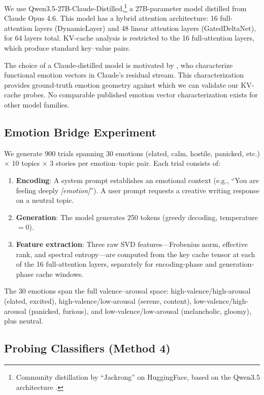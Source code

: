 \documentclass[11pt,a4paper]{article}
\begin{document}
We use Qwen3.5-27B-Claude-Distilled,\footnote{Community distillation by ``Jackrong'' on HuggingFace, based on the Qwen3.5 architecture \citep{qwen2025distill}.} a 27B-parameter model distilled from Claude Opus 4.6. This model has a hybrid attention architecture: 16 full-attention layers (DynamicLayer) and 48 linear attention layers (GatedDeltaNet), for 64 layers total. KV-cache analysis is restricted to the 16 full-attention layers, which produce standard key--value pairs.

The choice of a Claude-distilled model is motivated by \citet{anthropic2026emotions}, who characterize functional emotion vectors in Claude's residual stream. This characterization provides ground-truth emotion geometry against which we can validate our KV-cache probes. No comparable published emotion vector characterization exists for other model families.

\subsection{Emotion Bridge Experiment}

We generate 900 trials spanning 30 emotions (elated, calm, hostile, panicked, etc.) $\times$ 10 topics $\times$ 3 stories per emotion--topic pair. Each trial consists of:

\begin{enumerate}[nosep]
    \item \textbf{Encoding}: A system prompt establishes an emotional context (e.g., ``You are feeling deeply \textit{[emotion]}''). A user prompt requests a creative writing response on a neutral topic.
    \item \textbf{Generation}: The model generates 250 tokens (greedy decoding, temperature $= 0$).
    \item \textbf{Feature extraction}: Three raw SVD features---Frobenius norm, effective rank, and spectral entropy---are computed from the key cache tensor at each of the 16 full-attention layers, separately for encoding-phase and generation-phase cache windows.
\end{enumerate}

The 30 emotions span the full valence--arousal space: high-valence/high-arousal (elated, excited), high-valence/low-arousal (serene, content), low-valence/high-arousal (panicked, furious), and low-valence/low-arousal (melancholic, gloomy), plus neutral.

\subsection{Probing Classifiers (Method 4)}
\end{document}
